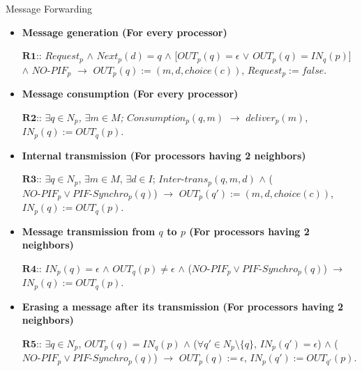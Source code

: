 \documentclass{llncs}
\begin{document}
\begin{algorithm}[htb]
\caption{Message Forwarding \label{algo:MF}}
\begin{scriptsize}

   \begin{itemize}
       \item{\textbf{Message generation (For every processor) }}

     $\textbf{R1}$:: $Request_{p}$ $\wedge$ $ Next_{p}(d)=q$ $\wedge$ [$OUT_{p}(q)=\epsilon$ $\vee$ $OUT_{p}(q)=IN_{q}(p)$] $\wedge$ \textit{$NO\mbox{-}PIF_{p}$ }$\rightarrow$ $OUT_{p}(q):=(m,d,choice(c))$, $Request_{p}:=false$.\\

       \item{\textbf{Message consumption (For every processor) }}

     $\textbf{R2}$:: \textit{$\exists q \in N_{p}$, $\exists m \in M$; $Consumption_{p}(q,m)$} $\rightarrow$ $deliver_{p}(m)$, $IN_{p}(q):=OUT_{q}(p)$.\\

        \item{\textbf{Internal transmission (For processors having 2 neighbors) }}

$\textbf{R3}$:: $\exists q \in N_{p}$, $\exists m \in M$, $\exists d \in \textit{I}$; $Inter\mbox{-}trans_{p}(q,m,d)$ $\wedge$ ($NO\mbox{-}PIF_{p} \vee PIF\mbox{-}Synchro_{p}(q)$) $\rightarrow$ $OUT_{p}(q'):=(m,d,choice(c))$, $IN_{p}(q):=OUT_{q}(p)$.\\


         \item{\textbf{Message transmission from $q$ to $p$ (For processors having 2 neighbors) }} 

$\textbf{R4}$:: $IN_{p}(q)=\epsilon$ $\wedge$ $OUT_{q}(p)\ne \epsilon$  $\wedge$ ($NO\mbox{-}PIF_{p} \vee PIF\mbox{-}Synchro_{p}(q)$)  $\rightarrow$ $IN_{p}(q):=OUT_{q}(p)$.\\


         \item{\textbf{Erasing a message after its transmission (For processors having 2 neighbors) }}

$\textbf{R5}$:: $\exists q \in N_{p}$, $OUT_{p}(q)=IN_{q}(p)$ $\wedge$ ($\forall q' \in N_{p}\setminus \{q\}$,
$IN_{p}(q')=\epsilon$) $\wedge$ ($NO\mbox{-}PIF_{p} \vee PIF\mbox{-}Synchro_{p}(q)$)   $\rightarrow$ $OUT_{p}(q):=\epsilon$, $IN_{p}(q'):=OUT_{q'}(p)$.\\
             



\end{itemize}
\end{scriptsize}
\end{algorithm}
\end{document}
